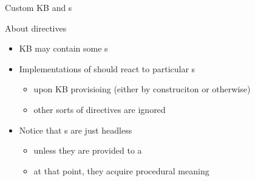 \documentclass[handout]{beamer}
\begin{document}
\begin{frame}[allowframebreaks]{Custom KB and s}

    \begin{block}{About directives}
        \begin{itemize}
            \item KB may contain some s
            \item Implementations of  should react to particular s
            \begin{itemize}
                \item upon KB provisioing (either by construciton or otherwise)
                \item other sorts of directives are ignored
            \end{itemize}
            \item Notice that s are just headless 
            \begin{itemize}
                \item unless they are provided to a 
                \item at that point, they acquire procedural meaning
            \end{itemize}
        \end{itemize}
    \end{block}

    \framebreak


\end{frame}
\end{document}

